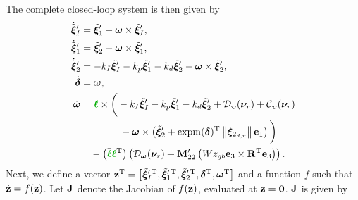 The complete closed-loop system is then given by
\begin{subequations}
    \begin{align}
        \dot{\tilde{\bs{\xi}}}_I^{\prime} &= \tilde{\bs{\xi}}_1^{\prime} - \bs{\omega} \times \tilde{\bs{\xi}}_I^{\prime}, \\
        \dot{\tilde{\bs{\xi}}}_1^{\prime} &= \tilde{\bs{\xi}}_2^{\prime} - \bs{\omega} \times \tilde{\bs{\xi}}_1^{\prime}, \\
        \dot{\tilde{\bs{\xi}}}_2^{\prime} &= -k_I \tilde{\bs{\xi}}_I^{\prime} - k_p \tilde{\bs{\xi}}_1^{\prime} - k_d \tilde{\bs{\xi}}_2^{\prime} - \bs{\omega} \times \tilde{\bs{\xi}}_2^{\prime}, \\
        \dot{\bs{\delta}} &= \bs{\omega}, \\
        \dot{\bs{\omega}} &= \Bar{\dm{\handl}} \times \bigg(-k_I \tilde{\bs{\xi}}_I^{\prime} - k_p \tilde{\bs{\xi}}_1^{\prime} - k_d \tilde{\bs{\xi}}_2^{\prime} + \mathcal{D}_{\bvel}(\vel_r) + \mathcal{C}_{\bvel}(\vel_r) \nonumber \\
        &\qquad \qquad - \bs{\omega} \times \left(\tilde{\bs{\xi}}_2^{\prime} + {\rm expm}(\bs{\delta})\T \norm{\bs{\xi}_{2_{d,r}}}\mat{e}_1\right)\bigg) \nonumber \\
        &\quad - \left(\Bar{\dm{\handl}}\dm{\handl}\T\right) \left(\mathcal{D}_{\bs{\omega}}(\vel_r) + \mat{M}_{22}^{\prime}\left(Wz_{gb} \mat{e}_3 \times \mathbf{R}\T \mat{e}_3\right)\right).
    \end{align}
\end{subequations}
Next, we define a vector $\mathbf{z}^{\mathrm{T}} = \left[{\tilde{\bm{\xi}}_I^{\prime\,{\rm T}}}, {\tilde{\bm{\xi}}_1^{\prime\,{\rm T}}}, {\tilde{\bm{\xi}}_2^{\prime\,{\rm T}}}, \bm{\delta}^{\mathrm{T}}, \bm{\omega}^{\mathrm{T}}\right]$ and a function $f$ such that $\dot{\mathbf{z}} = f(\mathbf{z})$.
Let $\mathbf{J}$ denote the Jacobian of $f(\mathbf{z})$, evaluated at $\mathbf{z} = \mathbf{0}$.
$\mathbf{J}$ is given by

